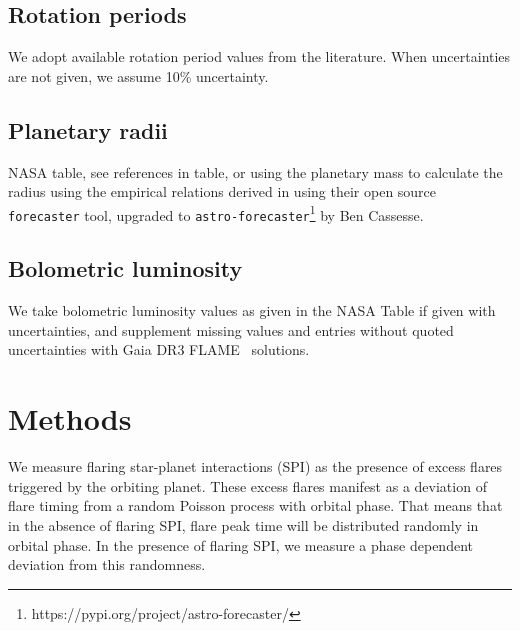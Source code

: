 \documentclass[twocolumn]{aastex631}
\begin{document}
\subsection{Rotation periods}
We adopt available rotation period values from the literature. When uncertainties are not given, we assume 10\% uncertainty.%

\subsection{Planetary radii}
NASA table, see references in table, or using the planetary mass to calculate the radius using the empirical relations derived in \cite{chen2007} using their open source \texttt{forecaster} tool, upgraded to \texttt{astro-forecaster}\footnote{https://pypi.org/project/astro-forecaster/} by Ben Cassesse. 






\subsection{Bolometric luminosity}

We take bolometric luminosity values as given in the NASA Table if given with uncertainties, and supplement missing values and entries without quoted uncertainties with Gaia DR3 FLAME~\citep{fouesneau2022gaia} solutions. 



\section{Methods}
\label{sec:methods}
We measure flaring star-planet interactions (SPI) as the presence of excess flares triggered by the orbiting planet. These excess flares manifest as a deviation of flare timing from a random Poisson process with orbital phase. That means that in the absence of flaring SPI, flare peak time will be distributed randomly in orbital phase. In the presence of flaring SPI, we measure a phase dependent deviation from this randomness.
\end{document}
